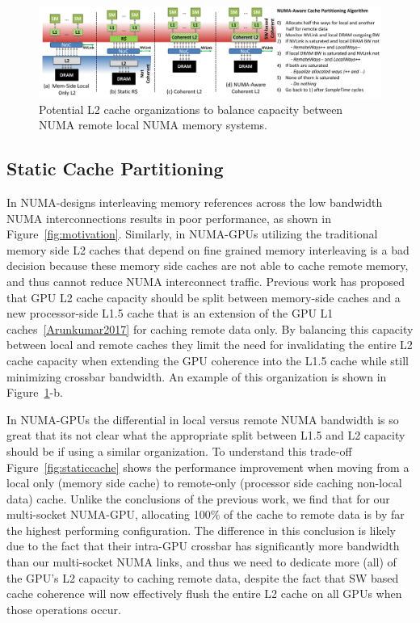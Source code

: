 \begin{figure}[t]
    \centering
    \includegraphics[width=1.0\textwidth]{figures/cache_configurations_static_dynamic.pdf}
    \caption{Potential L2 cache organizations to balance capacity between NUMA remote
    local NUMA memory systems.}
    \label{fig:cacheorg}
\end{figure}

\subsection{Static Cache Partitioning}
In NUMA-designs interleaving memory references across the low bandwidth NUMA
interconnections results in poor performance, as shown in Figure~\ref{fig:motivation}.
Similarly, in NUMA-GPUs utilizing the traditional memory side L2 caches that 
depend on fine grained memory interleaving is a bad decision because these memory
side caches are not able to cache remote memory, and thus cannot reduce NUMA
interconnect traffic.  Previous work has proposed that GPU L2 cache capacity
should be split between memory-side caches and a new processor-side L1.5 cache
that is an extension of the GPU L1 caches~\ref{Arunkumar2017} for caching remote
data only.  By balancing this capacity between local and remote caches they limit the 
need for invalidating the entire L2 cache capacity when extending the GPU coherence 
into the L1.5 cache while still minimizing crossbar bandwidth. An example of this 
organization is shown in Figure~\ref{fig:cacheorg}-b.

In NUMA-GPUs the differential in local versus remote NUMA bandwidth is so great
that its not clear what the appropriate split between L1.5 and L2 capacity should be
if using a similar organization.  To understand this trade-off Figure~\ref{fig:staticcache}
shows the performance improvement when moving from a local only (memory side cache)
to remote-only (processor side caching non-local data) cache.  Unlike the conclusions
of the previous work, we find that for our multi-socket NUMA-GPU, allocating
100\% of the cache to remote data is by far the highest performing configuration.
The difference in this conclusion is likely due to the fact that their intra-GPU
crossbar has significantly more bandwidth than our multi-socket NUMA links, and thus
we need to dedicate more (all) of the GPU's L2 capacity to caching remote data, despite
the fact that SW based cache coherence will now effectively flush the entire L2 cache
on all GPUs when those operations occur.

